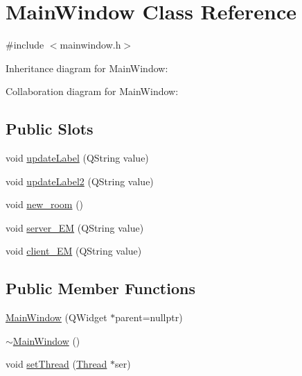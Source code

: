 \hypertarget{class_main_window}{}\section{Main\+Window Class Reference}
\label{class_main_window}


{\ttfamily \#include $<$mainwindow.\+h$>$}



Inheritance diagram for Main\+Window\+:


Collaboration diagram for Main\+Window\+:
\subsection*{Public Slots}
\begin{DoxyCompactItemize}
\item 
void \mbox{\hyperlink{class_main_window_ae0210b36ab2d1cce80443e36942e4ac7}{update\+Label}} (Q\+String value)
\item 
void \mbox{\hyperlink{class_main_window_a315247f5e13a056bb7b0eb9b7a1696a3}{update\+Label2}} (Q\+String value)
\item 
void \mbox{\hyperlink{class_main_window_a009cf1c98aea483a7e69beadd37198fc}{new\+\_\+room}} ()
\item 
void \mbox{\hyperlink{class_main_window_a49925c6b00f15c1d53039324c5527430}{server\+\_\+\+EM}} (Q\+String value)
\item 
void \mbox{\hyperlink{class_main_window_a413ee43572e60199c3c05beb320a49bb}{client\+\_\+\+EM}} (Q\+String value)
\end{DoxyCompactItemize}
\subsection*{Public Member Functions}
\begin{DoxyCompactItemize}
\item 
\mbox{\hyperlink{class_main_window_a996c5a2b6f77944776856f08ec30858d}{Main\+Window}} (Q\+Widget $\ast$parent=nullptr)
\item 
\mbox{\hyperlink{class_main_window_ae98d00a93bc118200eeef9f9bba1dba7}{$\sim$\+Main\+Window}} ()
\item 
void \mbox{\hyperlink{class_main_window_a251886b877d475b08cf0291c5529767e}{set\+Thread}} (\mbox{\hyperlink{class_thread}{Thread}} $\ast$ser)
\end{DoxyCompactItemize}
